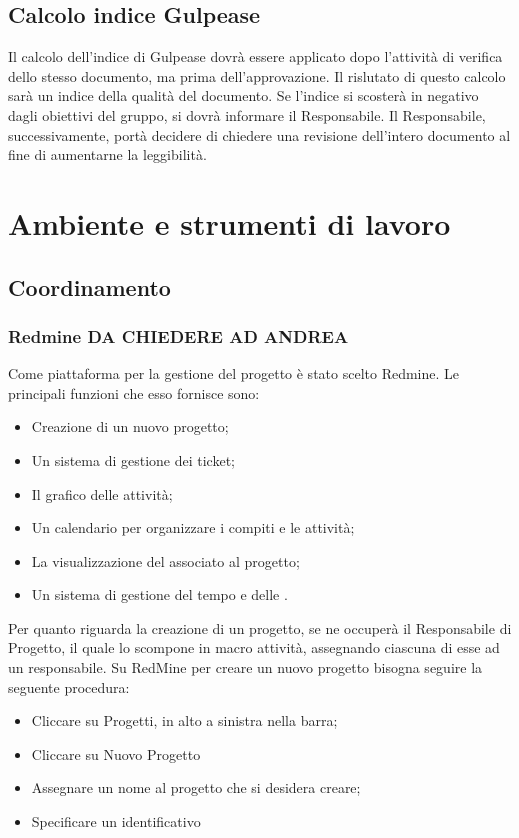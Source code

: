 \subsection{Calcolo indice Gulpease}
Il calcolo dell'indice di Gulpease dovrà essere applicato dopo l'attività di verifica dello stesso documento, ma prima dell'approvazione. Il rislutato di questo calcolo sarà un indice della qualità del documento. Se l'indice si scosterà in negativo dagli obiettivi del gruppo, si dovrà informare il Responsabile. Il Responsabile, successivamente, portà decidere di chiedere una revisione dell'intero documento al fine di aumentarne la leggibilità.


\newpage
\section{Ambiente e strumenti di lavoro}
\label{4.0}

\subsection{Coordinamento}
\label{}

\subsubsection{Redmine DA CHIEDERE AD ANDREA}
\label{4.1}
Come piattaforma per la gestione del progetto è stato scelto Redmine. Le principali funzioni che esso fornisce sono:
\begin{itemize}
\item Creazione di un nuovo progetto;
\item Un sistema di gestione dei ticket;
\item Il grafico  delle attività;
\item Un calendario per organizzare i compiti e le attività;
\item La visualizzazione del  associato al progetto;
\item Un sistema di  gestione del tempo e delle .
\end{itemize}
Per quanto riguarda la creazione di un progetto, se ne occuperà il Responsabile di Progetto, il quale lo scompone in macro attività, assegnando ciascuna di esse ad un responsabile.
Su RedMine per creare un nuovo progetto bisogna seguire la seguente procedura:
\begin{itemize}
\item Cliccare su Progetti, in alto a sinistra nella barra;
\item Cliccare su Nuovo Progetto
\item Assegnare un nome al progetto che si desidera creare;
\item Specificare un identificativo
\end{itemize}
